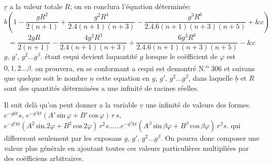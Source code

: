 \documentclass[11pt,a4paper]{article}
\begin{document}


$\underline{r}$ a la valeur totale $R$; on en conclura l'équation
déterminée:
\[ b\left(1 - \frac{gR^2}{2(n+1)} + \frac{g^2R^4}{2.4(n+1)(n+3)} - \frac{g^3R^6}{2.4.6(n+1)(n+3)(n+5)} + \&c\right) \]
\[ = \frac{2gR}{2(n+1)} - \frac{4g^2R^3}{2.4(n+1)(n+3)} + \frac{6g^3R^6}{2.4.6(n+1)(n+3)(n+5)} - \&c \]
$g$, $g'$, $g^2 \ldots g^\beta$. étant cequi devient laquantité $g$ lorsque
 le coëfficient de $\varphi$ est $0, 1, 2 \ldots \beta$. on prouvera,
en se conformant a cequi est demontré N.\textsuperscript{o} 306 et suivans \emph{}
que quelque soit le nombre $\underline{n}$ cette equation en
$g$, $g'$, $g^2 \ldots g^\beta$, dans laquelle $\underline{b}$ et $R$ sont des quantités
déterminées a une infinité de racines réelles.

Il suit delà qu'on peut donner a la variable $\underline{v}$ une infinité
de valeurs des formes. $e^{-gkt}s$, $e^{-g'kt}(A'\,\text{sin}\,\varphi + B'\,\text{cos}\,\varphi)\,r\,s$,
$e^{-g^2kt}(A^2\,\text{sin}.2\varphi + B^2\,\text{cos}\,2\varphi)\,r^2s \ldots\ldots e^{-g^\beta kt}(A^\beta\,\text{sin}\,\beta\varphi + B^\beta\,\text{cos}\,\beta\varphi)\,r^\beta s$.
qui differeront seulement par les exposans $g$, $g'$, $g^2 \ldots g^\beta$.
On pourra donc composer une valeur plus générale en ajoutant
toutes ces valeurs  particulières multipliées par des coëfficiens
arbitraires.
\end{document}
